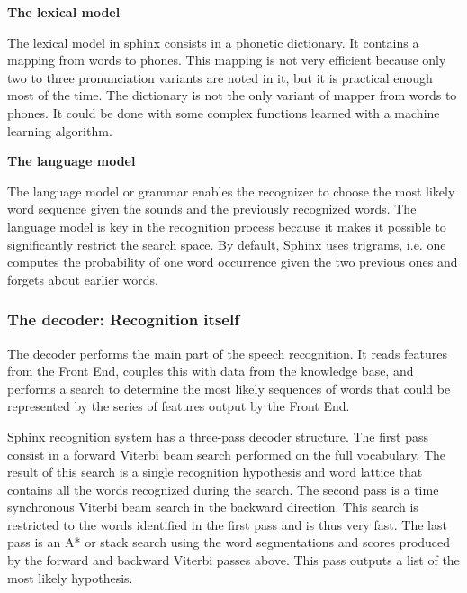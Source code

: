 \textbf{The lexical model}

The lexical model in sphinx consists in a phonetic dictionary. It contains a mapping from words to phones. This mapping is not very efficient because only two to three pronunciation variants are noted in it, but it is practical enough most of the time. The dictionary is not the only variant of mapper from words to phones. It could be done with some complex functions learned with a machine learning algorithm. 

\textbf{The language model}
 
The language model or grammar enables the recognizer to choose the most likely word sequence given the sounds and the previously recognized words. The language model is key in the recognition process because it makes it possible to significantly restrict the search space. By default, Sphinx uses trigrams, i.e. one computes the probability of one word occurrence given the two previous ones and forgets about earlier words.  

\subsubsection*{The decoder: Recognition itself}
The decoder performs the main part of the speech recognition. It reads features from the Front End, couples this with data from the knowledge base, and performs a search to determine the most likely sequences of words that could be represented by the series of features output by the Front End.

Sphinx recognition system has a three-pass decoder structure. The first pass consist in a forward Viterbi beam search performed on the full vocabulary. The result of this search is a single recognition hypothesis and word lattice that contains all the words recognized during the search. The second pass is a time synchronous Viterbi beam search in the backward direction. This search is restricted to the words identified in the first pass and is thus very fast. The last pass is an A* or stack search using the word segmentations and scores produced by the forward and backward Viterbi passes above. This pass outputs a list of the most likely hypothesis.